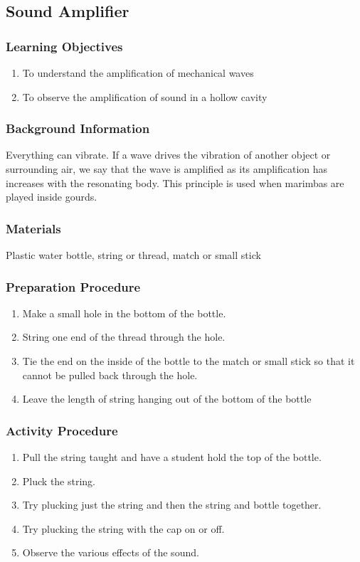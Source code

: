 \subsection{Sound Amplifier}

\subsubsection*{Learning Objectives}
\begin{enumerate}
\item{To understand the amplification of mechanical waves}
\item{To observe the amplification of sound in a hollow cavity}
\end{enumerate}

\subsubsection*{Background Information}
Everything can vibrate.  If a wave drives the vibration of another object or surrounding air, we say that the wave is amplified as its amplification has increases with the resonating body.  This principle is used when marimbas are played inside gourds.

\subsubsection*{Materials}
Plastic water bottle, string or thread, match or small stick

\subsubsection*{Preparation Procedure}
\begin{enumerate}
\item{Make a small hole in the bottom of the bottle.}
\item{String one end of the thread through the hole.}
\item{Tie the end on the inside of the bottle to the match or small stick so that it cannot be pulled back through the hole.}
\item{Leave the length of string hanging out of the bottom of the bottle}
\end{enumerate}

\subsubsection*{Activity Procedure}
\begin{enumerate}
\item{Pull the string taught and have a student hold the top of the bottle.}
\item{Pluck the string.}
\item{Try plucking just the string and then the string and bottle together.}
\item{Try plucking the string with the cap on or off.}
\item{Observe the various effects of the sound.}
\end{enumerate}

